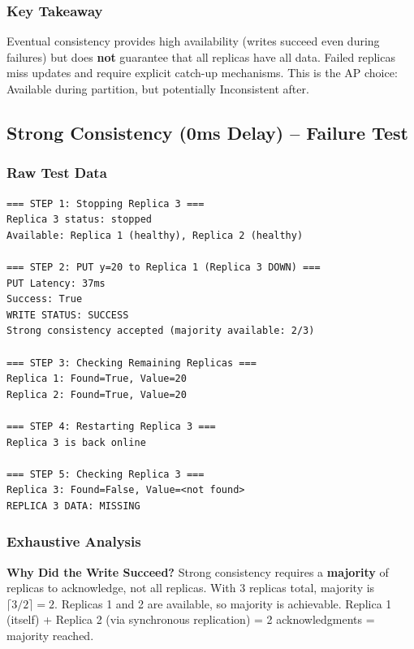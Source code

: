 \documentclass[10pt,a4paper]{article}
\begin{document}
\subsubsection{Key Takeaway}

Eventual consistency provides high availability (writes succeed even during failures) but does \textbf{not} guarantee that all replicas have all data. Failed replicas miss updates and require explicit catch-up mechanisms. This is the AP choice: Available during partition, but potentially Inconsistent after.

\subsection{Strong Consistency (0ms Delay) -- Failure Test}

\subsubsection{Raw Test Data}

\begin{verbatim}
=== STEP 1: Stopping Replica 3 ===
Replica 3 status: stopped
Available: Replica 1 (healthy), Replica 2 (healthy)

=== STEP 2: PUT y=20 to Replica 1 (Replica 3 DOWN) ===
PUT Latency: 37ms
Success: True
WRITE STATUS: SUCCESS
Strong consistency accepted (majority available: 2/3)

=== STEP 3: Checking Remaining Replicas ===
Replica 1: Found=True, Value=20
Replica 2: Found=True, Value=20

=== STEP 4: Restarting Replica 3 ===
Replica 3 is back online

=== STEP 5: Checking Replica 3 ===
Replica 3: Found=False, Value=<not found>
REPLICA 3 DATA: MISSING
\end{verbatim}

\subsubsection{Exhaustive Analysis}

\textbf{Why Did the Write Succeed?} Strong consistency requires a \textbf{majority} of replicas to acknowledge, not all replicas. With 3 replicas total, majority is $\lceil 3/2 \rceil = 2$. Replicas 1 and 2 are available, so majority is achievable. Replica 1 (itself) + Replica 2 (via synchronous replication) = 2 acknowledgments = majority reached.
\end{document}
